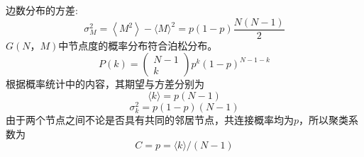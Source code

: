 边数分布的方差:
\begin{equation}
    \sigma_M^2=\left\langle M^2\right\rangle-\langle M\rangle^2=p(1-p) \frac{N(N-1)}{2}
\end{equation}
$G(N，M)$中节点度的概率分布符合泊松分布。
\begin{equation}
    P(k)=\left(\begin{array}{c}
    N-1 \\
    k
    \end{array}\right) p^k(1-p)^{N-1-k}
\end{equation}
根据概率统计中的内容，其期望与方差分别为
\begin{equation}
    \langle k\rangle=p(N-1)
\end{equation}
\begin{equation}
    \sigma_k^2=p(1-p)(N-1)
\end{equation}
由于两个节点之间不论是否具有共同的邻居节点，共连接概率均为$p$，所以聚类系数为
\begin{equation}
    C=p=\langle k\rangle /(N-1)
\end{equation}
